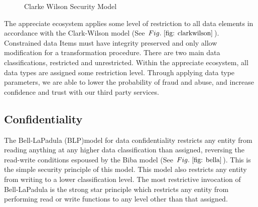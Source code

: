 \documentclass[a4paper,onecolumn, 10.5pt]{article}
\begin{document}
\begin{figure}[!htb]
\centering %
\caption{Clarke Wilson Security Model}
\label{fig: clarkwilson}
\end{figure}


The appreciate ecosystem applies some level of restriction to all data elements in accordance with the Clark-Wilson model (See \(Fig.~\ref{fig: clarkwilson} \)). Constrained data Items must have integrity preserved and only allow modification for a transformation procedure. There are two main data classifications, restricted and unrestricted. Within the appreciate ecosystem, all data types are assigned some restriction level. Through applying data type parameters, we are able to lower the probability of fraud and abuse, and increase confidence and trust with our third party services. 


\subsection{Confidentiality}
The Bell-LaPadula (BLP)\cite{securecomp}model for data confidentiality restricts any entity from reading anything at any higher data classification than assigned, reversing the read-write conditions espoused by the Biba model (See \(Fig.~\ref{fig: bella} \)). 
 This is the simple security principle of this model. This model also restricts any entity from writing to a lower classification level. The most restrictive invocation of Bell-LaPadula is the strong star principle which restricts any entity from performing read or write functions to any level other than that assigned.
\end{document}
